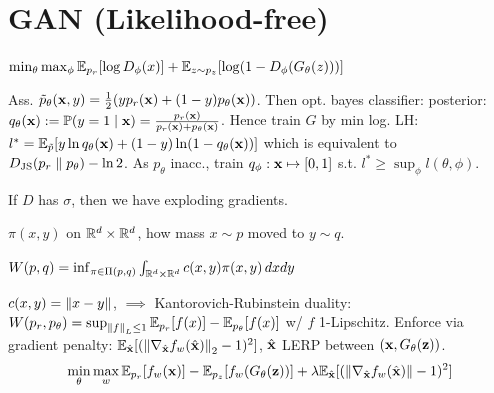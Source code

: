 \section{GAN (Likelihood-free)}

\begin{definition}[Obj]
    \(\min_\theta \max_\phi \mathbb{E}_{p_r}[\log D_\phi(x)] + \mathbb{E}_{z \sim p_z}[\log(1 - D_\phi(G_\theta(z)))]\)
\end{definition}

\begin{definition}
    Ass. \(\tilde p_\theta(\vb{x}, y) = \frac 1 2 (y p_r(\vb{x}) + (1 - y) p_\theta(\vb{x}))\). Then opt. bayes classifier: posterior: \(q_\theta(\vb{x}) := \mathbb{P}(y=1 \mid \vb{x}) = \frac{p_r(\vb{x})}{p_r(\vb{x}) + p_\theta(\vb{x})}\). Hence train \(G\) by min log. LH: \(l^* = \mathbb{E}_{\tilde{p}}[y \ln q_\theta(\vb{x}) + (1 - y)\ln(1 - q_\theta(\vb{x}))] \) which is equivalent to \(D_{\text{JS}}(p_r \parallel p_\theta) - \ln 2\). As \(p_\theta\) inacc., train \(q_\phi: \vb{x} \mapsto [0, 1]\) s.t. \(l^* \geq \sup_\phi l(\theta, \phi)\).
\end{definition}

\begin{definition}[Issues]
    If \(D\) has \(\sigma\), then we have exploding gradients.
\end{definition}

\begin{definition}
    \(\pi(x, y)\) on \(\mathbb{R}^d \times \mathbb{R}^d\), how mass \(x \sim p\) moved to \(y \sim q\).
\end{definition}

\begin{definition}
    \(W(p, q) = \inf_{\pi \in \Pi(p, q)} \int_{\mathbb{R}^d \times \mathbb{R}^d} c(x, y) \pi(x, y) \, dxdy\)
\end{definition}

\begin{definition}[WGAN]
    \(c(x, y) = \norm{x - y}\),  \(\implies\) Kantorovich-Rubinstein duality: \(W(p_r, p_\theta) = \sup_{\norm{f}_L \leq 1} \mathbb{E}_{p_r}[f(x)] - \mathbb{E}_{p_\theta}[f(x)]\) w/ \(f\) 1-Lipschitz. Enforce via gradient penalty: \(\mathbb{E}_{\hat{\vb{x}}}[(\norm{\nabla_{\hat{\vb{x}}} f_w(\hat{\vb{x}})}_2 - 1)^2]\), \(\hat{\vb{x}}\) LERP between \((\vb{x}, G_\theta(\vb{z}))\).
    \vspace{-1em}
    \[\min_\theta \max_w \mathbb{E}_{p_r}[f_w(\vb{x})] - \mathbb{E}_{p_z}[f_w(G_\theta(\vb{z}))] + \lambda \mathbb{E}_{\hat{\vb{x}}}[(\norm{\nabla_{\hat{\vb{x}}} f_w(\hat{\vb{x}})} - 1)^2]\]
\end{definition}
